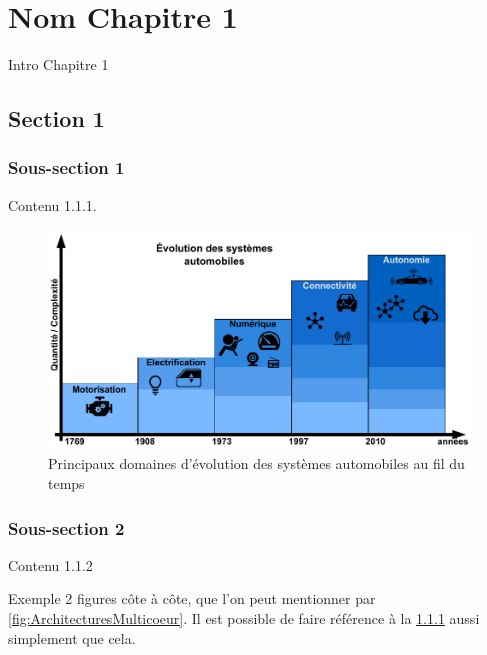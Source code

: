 \documentclass[french, a4paper, 11pt, twoside, pdftex]{StyleThese}
\begin{document}
\setcounter{chapter}{1}
\dominitoc
\faketableofcontents
\fi

\chapter{Nom Chapitre 1} \label{chap:1_EnjeuxIntro}
\minitoc

Intro Chapitre 1

\section{Section 1}
	\subsection{Sous-section 1} \label{sec:1.1Sous-section1}

		Contenu 1.1.1.

		\begin{figure}[ht!]
			\centering
			\includegraphics[width=0.9\linewidth]{schemas/Evo_Sys_Automobile}
			\caption[Évolutions des Systèmes Automobiles]{Principaux domaines d'évolution des systèmes automobiles au fil du temps}
			\label{fig:evo_sys_automobile}
		\end{figure}



	\subsection{Sous-section 2}

		Contenu 1.1.2

		Exemple 2 figures côte à côte, que l'on peut mentionner par \autoref{fig:ArchitecturesMulticoeur}.
		Il est possible de faire référence à la \ref{sec:1.1Sous-section1} aussi simplement que cela.
\end{document}
